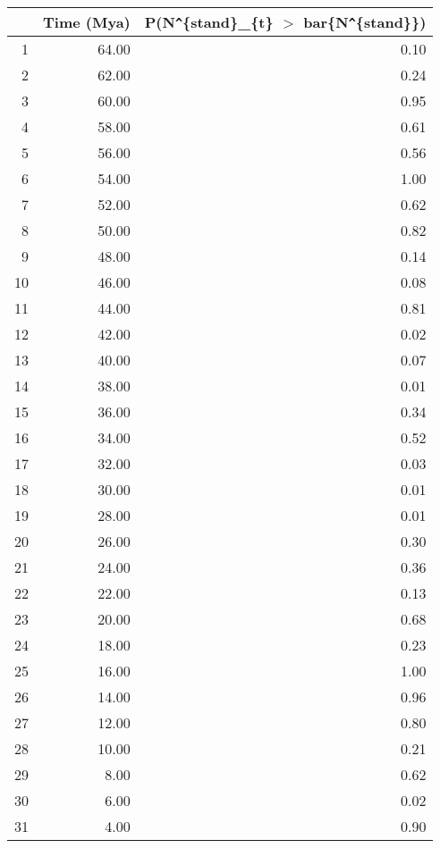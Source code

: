 \begin{table}[ht]
\centering
\begin{tabular}{rrr}
  \hline
 & Time (Mya) & P(N\verb|^|\{stand\}\_\{t\} $>$ bar\{N\verb|^|\{stand\}\}) \\ 
  \hline
1 & 64.00 & 0.10 \\ 
  2 & 62.00 & 0.24 \\ 
  3 & 60.00 & 0.95 \\ 
  4 & 58.00 & 0.61 \\ 
  5 & 56.00 & 0.56 \\ 
  6 & 54.00 & 1.00 \\ 
  7 & 52.00 & 0.62 \\ 
  8 & 50.00 & 0.82 \\ 
  9 & 48.00 & 0.14 \\ 
  10 & 46.00 & 0.08 \\ 
  11 & 44.00 & 0.81 \\ 
  12 & 42.00 & 0.02 \\ 
  13 & 40.00 & 0.07 \\ 
  14 & 38.00 & 0.01 \\ 
  15 & 36.00 & 0.34 \\ 
  16 & 34.00 & 0.52 \\ 
  17 & 32.00 & 0.03 \\ 
  18 & 30.00 & 0.01 \\ 
  19 & 28.00 & 0.01 \\ 
  20 & 26.00 & 0.30 \\ 
  21 & 24.00 & 0.36 \\ 
  22 & 22.00 & 0.13 \\ 
  23 & 20.00 & 0.68 \\ 
  24 & 18.00 & 0.23 \\ 
  25 & 16.00 & 1.00 \\ 
  26 & 14.00 & 0.96 \\ 
  27 & 12.00 & 0.80 \\ 
  28 & 10.00 & 0.21 \\ 
  29 & 8.00 & 0.62 \\ 
  30 & 6.00 & 0.02 \\ 
  31 & 4.00 & 0.90 \\ 
   \hline
\end{tabular}
\label{tab:div_peak}
\end{table}
